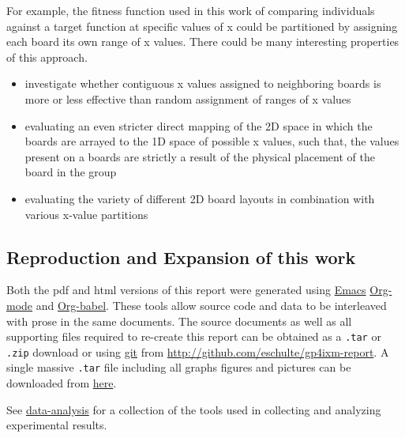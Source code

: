 \documentclass[11pt]{article}
\begin{document}
For example, the fitness function used in this work of comparing
individuals against a target function at specific values of x could be
partitioned by assigning each board its own range of x values.  There
could be many interesting properties of this approach.
\begin{itemize}
\item investigate whether contiguous x values assigned to neighboring
  boards is more or less effective than random assignment of ranges of
  x values
\item evaluating an even stricter direct mapping of the 2D space in which
  the boards are arrayed to the 1D space of possible x values, such
  that, the values present on a boards are strictly a result of the
  physical placement of the board in the group
\item evaluating the variety of different 2D board layouts in combination
  with various x-value partitions
\end{itemize}

\subsection*{Reproduction and Expansion of this work}
\label{sec-1.8}
\label{reproduction}

Both the pdf and html versions of this report were generated using
\href{http://www.gnu.org/software/emacs/}{Emacs} \href{http://orgmode.org/}{Org-mode} and \href{http://orgmode.org/worg/org-contrib/babel/org-babel.php}{Org-babel}.  These tools allow source code and data
to be interleaved with prose in the same documents.  The source
documents as well as all supporting files required to re-create this
report can be obtained as a \texttt{.tar} or \texttt{.zip} download or using \href{http://git-scm.com/}{git}
from \href{http://github.com/eschulte/gp4ixm-report}{http://github.com/eschulte/gp4ixm-report}.  A single massive
\texttt{.tar} file including all graphs figures and pictures can be
downloaded from \hyperref[somewhere]{here}.

See \href{file:///nfs/adaptive/eschulte/src/gp4ixm-report/data-analysis.org}{data-analysis} for a collection of the tools used in collecting and
analyzing experimental results.
\end{document}
